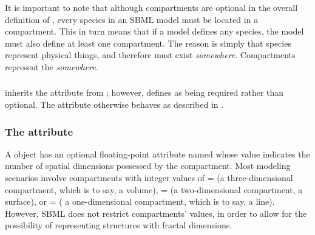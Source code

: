It is important to note that although compartments are optional in
the overall definition of \Model, every species in an SBML model
must be located in a compartment.  This in turn means that if a
model defines any species, the model must also define at least one
compartment.  The reason is simply that species represent physical
things, and therefore must exist \emph{somewhere}.  Compartments
represent the \emph{somewhere}.


\subsubsection{}

{\Compartment inherits the  attribute from \SBase; however, \Compartment defines  as being required rather than optional.  The attribute otherwise behaves as described in .}



\subsubsection{The  attribute}
\label{sec:compartment-spatialdimensions}

A \Compartment object has an optional floating-point attribute
named  whose value indicates the number
of spatial dimensions possessed by the compartment.  Most modeling
scenarios involve compartments with integer values of
= (\ie a three-dimensional
compartment, which is to say, a volume),
= (\ie a two-dimensional
compartment, a surface), or = (\ie
a one-dimensional compartment, which is to say, a line).  However,
SBML \thisL does not restrict compartments'
 values, in order to allow for the
possibility of representing structures with fractal dimensions.

